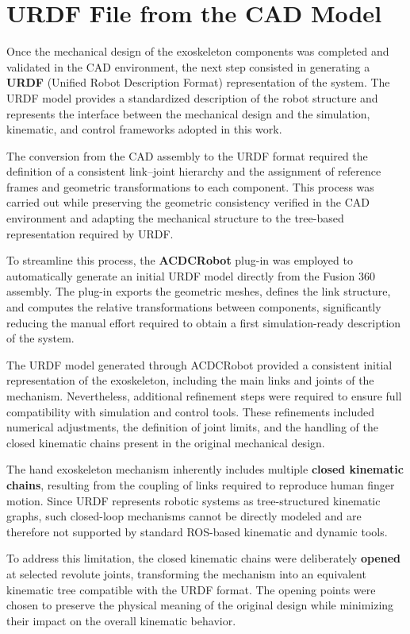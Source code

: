 \section{URDF File from the CAD Model}
Once the mechanical design of the exoskeleton components was completed and validated in the CAD environment, the next step consisted in generating a \textbf{URDF} (Unified Robot Description Format) representation of the system. The URDF model provides a standardized description of the robot structure and represents the interface between the mechanical design and the simulation, kinematic, and control frameworks adopted in this work.

The conversion from the CAD assembly to the URDF format required the definition of a consistent link–joint hierarchy and the assignment of reference frames and geometric transformations to each component. This process was carried out while preserving the geometric consistency verified in the CAD environment and adapting the mechanical structure to the tree-based representation required by URDF.

To streamline this process, the \textbf{ACDCRobot} plug-in \cite{ACDC4Robot} was employed to automatically generate an initial URDF model directly from the Fusion 360 assembly. The plug-in exports the geometric meshes, defines the link structure, and computes the relative transformations between components, significantly reducing the manual effort required to obtain a first simulation-ready description of the system.

The URDF model generated through ACDCRobot provided a consistent initial representation of the exoskeleton, including the main links and joints of the mechanism. Nevertheless, additional refinement steps were required to ensure full compatibility with simulation and control tools. These refinements included numerical adjustments, the definition of joint limits, and the handling of the closed kinematic chains present in the original mechanical design.

The hand exoskeleton mechanism inherently includes multiple \textbf{closed kinematic chains}, resulting from the coupling of links required to reproduce human finger motion. Since URDF represents robotic systems as tree-structured kinematic graphs, such closed-loop mechanisms cannot be directly modeled and are therefore not supported by standard ROS-based kinematic and dynamic tools.

To address this limitation, the closed kinematic chains were deliberately \textbf{opened} at selected revolute joints, transforming the mechanism into an equivalent kinematic tree compatible with the URDF format. The opening points were chosen to preserve the physical meaning of the original design while minimizing their impact on the overall kinematic behavior.


